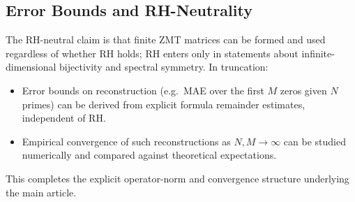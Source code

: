 \documentclass[11pt]{article}
\begin{document}
\subsection{Error Bounds and RH-Neutrality}

The RH-neutral claim is that finite ZMT matrices can be formed and used regardless of whether RH holds; RH enters only in statements about infinite-dimensional bijectivity and spectral symmetry. In truncation:

\begin{itemize}
  \item Error bounds on reconstruction (e.g.\ MAE over the first $M$ zeros given $N$ primes) can be derived from explicit formula remainder estimates, independent of RH.
  \item Empirical convergence of such reconstructions as $N,M\to\infty$ can be studied numerically and compared against theoretical expectations.
\end{itemize}

This completes the explicit operator-norm and convergence structure underlying the main article.
\nocite{*}


\end{document}
